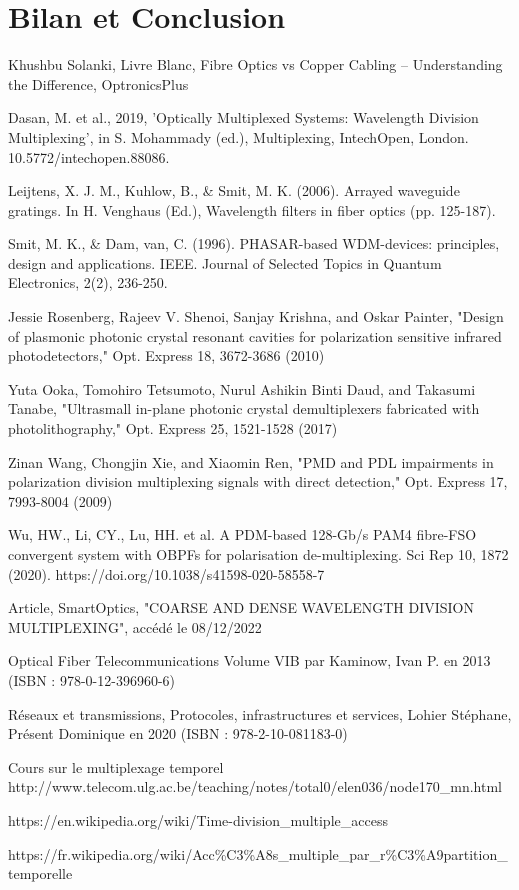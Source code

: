\documentclass[oneside]{book}
\begin{document}
		\section{Bilan et Conclusion}




			\clearpage
			\pagestyle{bib}
			\begin{thebibliography}{9}

				Khushbu Solanki, Livre Blanc, Fibre Optics vs Copper Cabling – Understanding the Difference, OptronicsPlus

				Dasan, M. et al., 2019, 'Optically Multiplexed Systems: Wavelength Division Multiplexing', in S. Mohammady (ed.), Multiplexing, IntechOpen, London. 10.5772/intechopen.88086.

				Leijtens, X. J. M., Kuhlow, B., \& Smit, M. K. (2006). Arrayed waveguide gratings. In H. Venghaus (Ed.), Wavelength filters in fiber optics (pp. 125-187).

				Smit, M. K., \& Dam, van, C. (1996). PHASAR-based WDM-devices: principles, design and applications. IEEE. Journal of Selected Topics in Quantum Electronics, 2(2), 236-250.

				Jessie Rosenberg, Rajeev V. Shenoi, Sanjay Krishna, and Oskar Painter, "Design of plasmonic photonic crystal resonant cavities for polarization sensitive infrared photodetectors," Opt. Express 18, 3672-3686 (2010)


				Yuta Ooka, Tomohiro Tetsumoto, Nurul Ashikin Binti Daud, and Takasumi Tanabe, "Ultrasmall in-plane photonic crystal demultiplexers fabricated with photolithography," Opt. Express 25, 1521-1528 (2017)

				Zinan Wang, Chongjin Xie, and Xiaomin Ren, "PMD and PDL impairments in polarization division multiplexing signals with direct detection," Opt. Express 17, 7993-8004 (2009)

				Wu, HW., Li, CY., Lu, HH. et al. A PDM-based 128-Gb/s PAM4 fibre-FSO convergent system with OBPFs for polarisation de-multiplexing. Sci Rep 10, 1872 (2020). https://doi.org/10.1038/s41598-020-58558-7

				Article, SmartOptics, "COARSE AND DENSE WAVELENGTH DIVISION MULTIPLEXING", accédé le 08/12/2022

				 Optical Fiber Telecommunications Volume VIB par Kaminow, Ivan P. en 2013
(ISBN : 978-0-12-396960-6)

				Réseaux et transmissions, Protocoles, infrastructures et services, Lohier Stéphane,
Présent Dominique en 2020 (ISBN : 978-2-10-081183-0)

				Cours sur le multiplexage temporel http://www.telecom.ulg.ac.be/teaching/notes/total0/elen036/node170\_mn.html

				https://en.wikipedia.org/wiki/Time-division\_multiple\_access

				https://fr.wikipedia.org/wiki/Acc\%C3\%A8s\_multiple\_par\_r\%C3\%A9partition\_temporelle
		\end{thebibliography}




	
\end{document}
